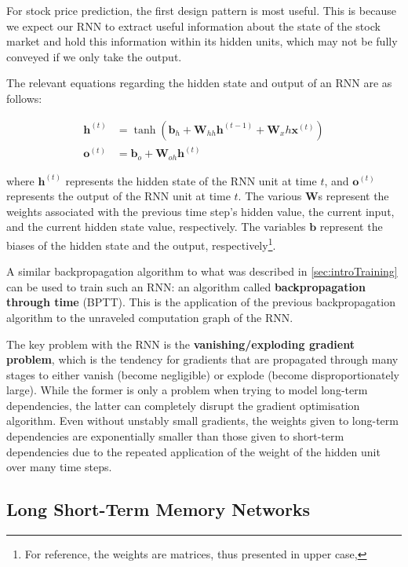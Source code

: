 \documentclass[12pt,a4paper,twoside,openright]{report}
\renewcommand{\vec}[1]{\mathbf{#1}}
\begin{document}
For stock price prediction, the first design pattern is most useful. This is because
we expect our RNN to extract useful information about the state of the stock market and hold this
information within its hidden units, which may not be fully conveyed if we only
take the output.

The relevant equations regarding the hidden state and output of an RNN are as follows:

\begin{align}
\vec{h}^{(t)} &= \tanh(\vec{b}_h + \vec{W}_{hh}\vec{h}^{(t-1)} + \vec{W}_xh\vec{x}^{(t)})\\
\vec{o}^{(t)} &= \vec{b}_o + \vec{W}_{oh}\vec{h}^{(t)}
\end{align}

where $\vec{h}^{(t)}$ represents the hidden state of the RNN unit at time $t$,
and $\vec{o}^{(t)}$ represents the output of the RNN unit at time $t$. The various
$\vec{W}$s represent the weights associated with the previous 
time step's hidden value, the current input, and the current hidden state value, respectively.
The variables $\vec{b}$ represent the biases of the hidden state and the
output, respectively\footnote{For reference, the weights are matrices, thus presented in upper case,}.

A similar backpropagation algorithm to what was described in \cref{sec:introTraining} can be used
to train such an RNN: an algorithm called \textbf{backpropagation through time} (BPTT). 
This is the application of the
previous backpropagation algorithm to the unraveled computation graph of the RNN.

The key problem with the RNN is the
\textbf{vanishing/exploding gradient problem}, which
is the tendency for gradients that are propagated through many stages
to either vanish (become negligible) or explode (become disproportionately large). While the
former is only a problem when trying to model long-term dependencies, the latter can completely
disrupt the gradient optimisation algorithm. Even without unstably small gradients, the weights given to long-term dependencies are
exponentially smaller than those given to short-term dependencies due to the repeated application
of the weight of the hidden unit over many time steps.

\subsection{Long Short-Term Memory Networks}
\label{sec:introLSTM}
\end{document}
